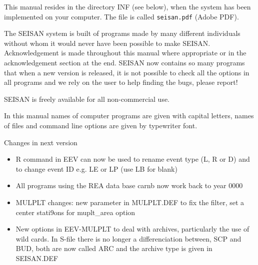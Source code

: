 This manual resides in the directory INF (see below), when the system 
has been implemented on your computer. The file is called 
\texttt{seisan.pdf} (Adobe PDF). 

The SEISAN system is built of programs made by many different individuals without whom it would never have been possible to make SEISAN. Acknowledgement is made throughout this manual where appropriate or in the acknowledgement section at the end. SEISAN now contains so many programs that when a new version is released, it is not possible to check all the options in all programs and we rely on the user to help finding the bugs, please report! 

SEISAN is freely available for all non-commercial use. 

In this manual names of computer programs are given with capital letters, names of 
files and command line options are given by typewriter font.


Changes in next version
\begin{itemize}
\item R command in EEV can now be used to rename event type (L, R or D) and to change event ID e.g. LE or LP (use LB for blank)
\item All programs using the REA data base carnb now work back to year 0000
\item MULPLT changes: new parameter in MULPLT.DEF to fix the filter, set a center stati9ons for muplt\_area option
\item New options in EEV-MULPLT to deal with archives, particularly the use of wild cards. In S-file there is no longer a differenciation between, SCP and BUD, both are now called ARC and the archive type is given in SEISAN.DEF
\end{itemize}

